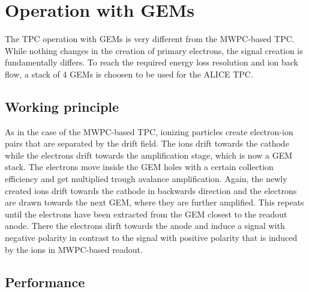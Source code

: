 \section{Operation with GEMs}
The TPC operation with GEMs is very different from the MWPC-based TPC. While nothing changes in the creation of primary electrons, the signal creation is fundamentally differs. To reach the required energy loss resolution and ion back flow, a stack of 4 GEMs is choosen to be used for the ALICE TPC.
\subsection{Working principle}
As in the case of the MWPC-based TPC, ionizing particles create electron-ion pairs that are separated by the drift field. The ions drift towards the cathode while the electrons drift towards the amplification stage, which is now a GEM stack. The electrons move inside the GEM holes with a certain collection efficiency and get multiplied trough avalance amplification. Again, the newly created ions drift towards the cathode in backwards direction and the electrons are drawn towards the next GEM, where they are further amplified. This repeats until the electrons have been extracted from the GEM closest to the readout anode. There the electrons dirft towards the anode and induce a signal with negative polarity in contrast to the signal with positive polarity that is induced by the ions in MWPC-based readout. 
\subsection{Performance}
